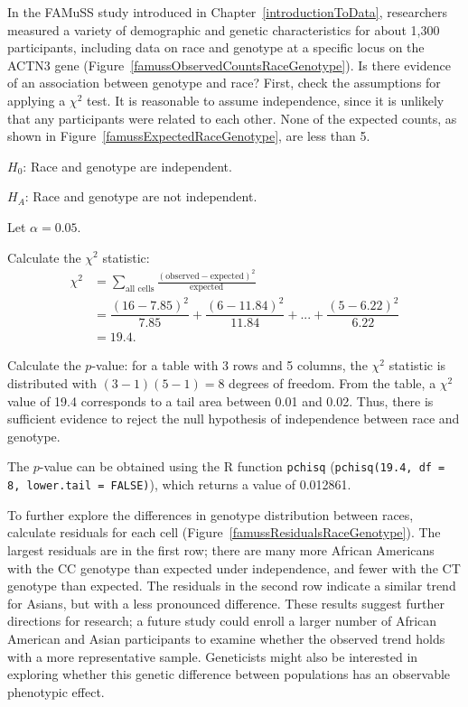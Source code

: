 
\begin{examplewrap}
  \begin{nexample}
    {In the FAMuSS study introduced in Chapter~\ref{introductionToData}, researchers measured a variety of demographic and genetic characteristics for about 1,300 participants, including data on race and genotype at a specific locus on the ACTN3 gene (Figure~\ref{famussObservedCountsRaceGenotype}).
    Is there evidence of an association between genotype and race?} First, check the assumptions for applying a $\chi^2$ test. It is reasonable to assume independence, since it is unlikely that any participants were related to each other. None of the expected counts, as shown in Figure~\ref{famussExpectedRaceGenotype}, are less than 5.

$H_0$: Race and genotype are independent.

$H_A$: Race and genotype are not independent.

Let $\alpha = 0.05$.

Calculate the $\chi^2$ statistic:
\begin{align*}
\chi^2 &= \sum_{\text{all cells}} \frac{(\text{observed} - \text{expected})^2}{\text{expected}} \\
&= \dfrac{(16-7.85)^2}{7.85} + \dfrac{(6-11.84)^2}{11.84} + ... + \dfrac{(5 - 6.22)^2}{6.22} \\
&=19.4.
\end{align*}

Calculate the $p$-value: for a table with 3 rows and 5 columns, the $\chi^2$ statistic is distributed with $(3-1)(5-1) = 8$ degrees of freedom. From the table, a $\chi^2$ value of 19.4 corresponds to a tail area between 0.01 and 0.02. Thus, there is sufficient evidence to reject the null hypothesis of independence between race and genotype.

The $p$-value can be obtained using the \textsf{R} function \texttt{pchisq} (\texttt{pchisq(19.4, df = 8, lower.tail = FALSE)}), which returns a value of 0.012861. %

To further explore the differences in genotype distribution between races, calculate residuals for each cell (Figure~\ref{famussResidualsRaceGenotype}). The largest residuals are in the first row; there are many more African Americans with the CC genotype than expected under independence, and fewer with the CT genotype than expected. The residuals in the second row indicate a similar trend for Asians, but with a less pronounced difference. These results suggest further directions for research; a future study could enroll a larger number of African American and Asian participants to examine whether the observed trend holds with a more representative sample. Geneticists might also be interested in exploring whether this genetic difference between populations has an observable phenotypic \mbox{effect}.
\end{nexample}
\end{examplewrap}

